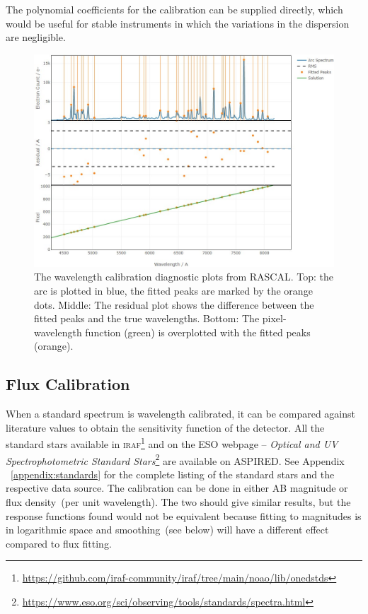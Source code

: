 \documentclass[fleqn,usenatbib]{mnras}
\begin{document}
The polynomial coefficients for the calibration can be supplied
directly, which would be useful for stable instruments in which
the variations in the dispersion are negligible.

\begin{figure}
    \centering
    \includegraphics[width=\columnwidth]{fig_05_wavelength_calibration_diagnostics.jpg}
    \caption{The wavelength calibration diagnostic plots from RASCAL.
    Top: the arc is plotted in blue, the fitted peaks are marked by
    the orange dots. Middle: The residual plot shows the difference
    between the fitted peaks and the true wavelengths. Bottom: The
    pixel-wavelength function (green) is overplotted with the fitted
    peaks (orange).}
    \label{fig:wavecal}
\end{figure}

\subsection{Flux Calibration}
When a standard spectrum is wavelength calibrated, it can be
compared against literature values to obtain the sensitivity
function of the detector. All the standard stars available in
\textsc{iraf}\footnote{\url{https://github.com/iraf-community/iraf/tree/main/noao/lib/onedstds}}
and on the ESO webpage -- \textit{Optical and UV Spectrophotometric
Standard Stars}\footnote{\url{https://www.eso.org/sci/observing/tools/standards/spectra.html}}
are available on \textsc{ASPIRED}. See Appendix ~\ref{appendix:standards} for
the complete listing of the standard stars and the respective data
source. The calibration can be done in either AB magnitude or
flux density~(per unit wavelength). The two should give similar
results, but the response functions found would not be equivalent
because fitting to magnitudes is in logarithmic space and smoothing~(see
below) will have a different effect compared to flux fitting.
\end{document}

